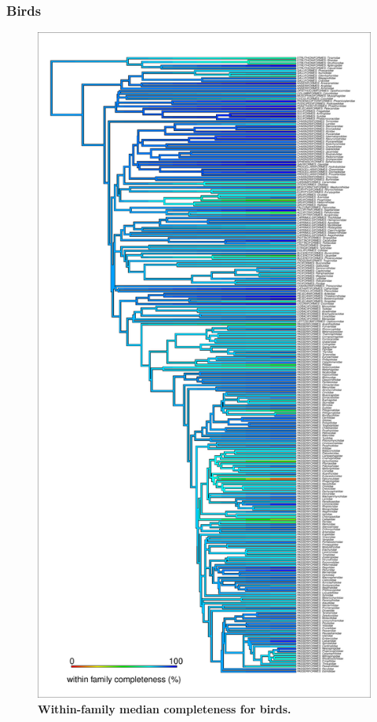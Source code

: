 \documentclass[11pt]{article}
\begin{document}
\subsubsection{Birds}
\begin{figure}[h!]
\centering
\includegraphics[scale=0.45]{figures/NA_phylo_patterns/Birds_completeness}
\caption[Within-family median completeness for birds]{\textbf{Within-family median completeness for birds.}}
\label{compPREDICTS}
\end{figure}
\end{document}
